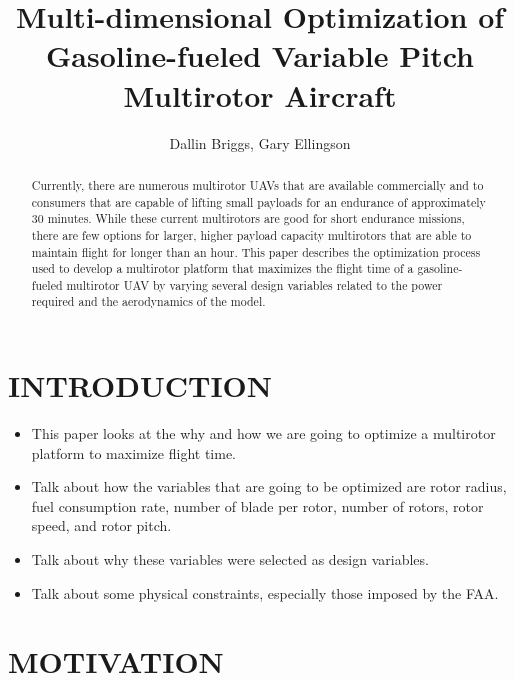 \documentclass[letterpaper, 10 pt, conference]{ieeeconf}  %
\title{\LARGE \bf
Multi-dimensional Optimization of Gasoline-fueled Variable Pitch Multirotor Aircraft
}
\author{Dallin Briggs, Gary Ellingson%
}
\begin{document}
\maketitle
\thispagestyle{empty}
\pagestyle{empty}


\begin{abstract}

Currently, there are numerous multirotor UAVs that are available commercially and to consumers that are capable of lifting small payloads for an endurance of approximately 30 minutes. While these current multirotors are good for short endurance missions, there are few options for larger, higher payload capacity multirotors that are able to maintain flight for longer than an hour. This paper describes the optimization process used to develop a multirotor platform that maximizes the flight time of a gasoline-fueled multirotor UAV by varying several design variables related to the power required and the aerodynamics of the model.

\end{abstract}


\section{INTRODUCTION}

\begin{itemize}
	\item{This paper looks at the why and how we are going to optimize a multirotor platform to maximize flight time.}
	\item{Talk about how the variables that are going to be optimized are rotor radius, fuel consumption rate, number of blade per rotor, number of rotors, rotor speed, and rotor pitch.}
	\item{Talk about why these variables were selected as design variables.}
	\item{Talk about some physical constraints, especially those imposed by the FAA.}
\end{itemize}






\section{MOTIVATION}
\end{document}
